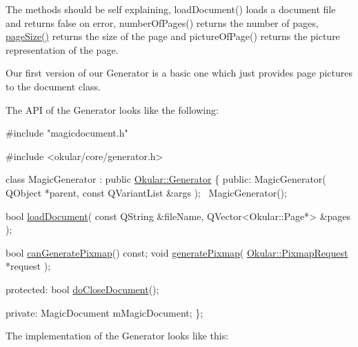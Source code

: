 The methods should be self explaining, load\+Document() loads a document file and returns false on error, number\+Of\+Pages() returns the number of pages, \hyperlink{classpageSize}{page\+Size()} returns the size of the page and picture\+Of\+Page() returns the picture representation of the page.

Our first version of our Generator is a basic one which just provides page pictures to the document class.

The A\+P\+I of the Generator looks like the following\+:


\begin{DoxyCode}
\textcolor{preprocessor}{#include "magicdocument.h"}

\textcolor{preprocessor}{#include <okular/core/generator.h>}

\textcolor{keyword}{class }MagicGenerator : \textcolor{keyword}{public} \hyperlink{classOkular_1_1Generator}{Okular::Generator}
\{
    \textcolor{keyword}{public}:
        MagicGenerator( QObject *parent, \textcolor{keyword}{const} QVariantList &args );
        ~MagicGenerator();

        \textcolor{keywordtype}{bool} \hyperlink{classOkular_1_1Generator_a388b47328a5297d53cdbdc6fcf074ee3}{loadDocument}( \textcolor{keyword}{const} QString &fileName, QVector<Okular::Page*> &pages );

        \textcolor{keywordtype}{bool} \hyperlink{classOkular_1_1Generator_abbf00927221e2d2b2b71101f2b7f5732}{canGeneratePixmap}() \textcolor{keyword}{const};
        \textcolor{keywordtype}{void} \hyperlink{classOkular_1_1Generator_a198cdcd9c27b179562c935342fd457b6}{generatePixmap}( \hyperlink{classOkular_1_1PixmapRequest}{Okular::PixmapRequest} *request );

    \textcolor{keyword}{protected}:
        \textcolor{keywordtype}{bool} \hyperlink{classOkular_1_1Generator_ad3f1dcb98f3bd87c87ad0e91ecf4a6d7}{doCloseDocument}();

    \textcolor{keyword}{private}:
        MagicDocument mMagicDocument;
\};
\end{DoxyCode}


The implementation of the Generator looks like this\+:


